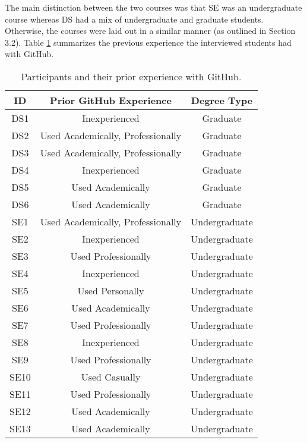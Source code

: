  The main distinction between the two courses was that SE was an undergraduate course whereas DS had a mix of undergraduate and graduate students. Otherwise, the courses were laid out in a similar manner (as outlined in Section 3.2). Table \ref{table:interviews:students} summarizes the previous experience the interviewed students had with GitHub.

\begin{table}[h]
    \vspace{-10pt}
        \caption{Participants and their prior experience with GitHub.}\label{table:interviews:students}
    \vspace{-10pt}
    \begin{center}
        \begin{tabular}{c | c | c}
            \hline
            ID & Prior GitHub Experience & Degree Type \\
            \hline
            DS1 & Inexperienced & Graduate \\ \hline
            DS2 & Used Academically, Professionally & Graduate \\ \hline
            DS3 & Used Academically, Professionally & Graduate \\ \hline
            DS4 & Inexperienced & Graduate \\ \hline
            DS5 & Used Academically & Graduate \\ \hline
            DS6 & Used Academically & Graduate \\ \hline
            SE1 & Used Academically, Professionally & Undergraduate \\ \hline
            SE2 & Inexperienced & Undergraduate \\ \hline
            SE3 & Used Professionally & Undergraduate \\ \hline
            SE4 & Inexperienced & Undergraduate \\ \hline
            SE5 & Used Personally & Undergraduate \\ \hline
            SE6 & Used Academically & Undergraduate \\ \hline
            SE7 & Used Professionally & Undergraduate \\ \hline
            SE8 & Inexperienced & Undergraduate \\ \hline
            SE9 & Used Professionally & Undergraduate \\ \hline
            SE10 & Used Casually & Undergraduate \\ \hline
            SE11 & Used Professionally & Undergraduate \\ \hline
            SE12 & Used Academically & Undergraduate \\ \hline
            SE13 & Used Academically & Undergraduate \\ \hline
        \end{tabular}
    \end{center}
    \vspace{-12pt}
\end{table}

